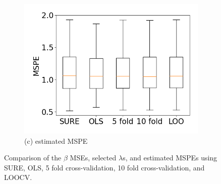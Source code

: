 \begin{figure}[t!]
\begin{subfigure}[b]{.32\columnwidth}
    \includegraphics[width=\columnwidth]{../fig/collinear_mspe.png}
    \caption{(c) estimated MSPE}
    \label{fig:mspe}
\end{subfigure}
\caption{Comparison of the $\beta$ MSEs, selected $\lambda$s, and estimated MSPEs using SURE, OLS, 5 fold cross-validation, 10 fold cross-validation, and LOOCV.}
\end{figure}


